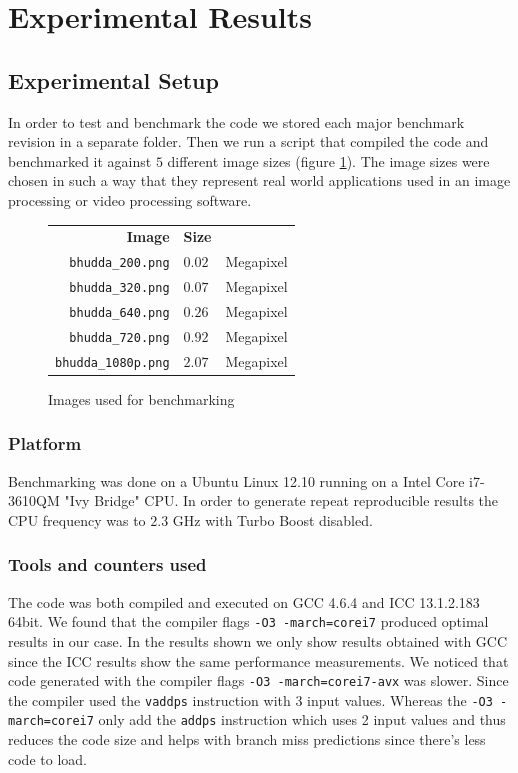 \section{Experimental Results}\label{sec:exp}
\subsection{Experimental Setup}\label{sec:exp_setup8}
In order to test and benchmark the code we stored each major benchmark revision in a separate folder. Then we run a script that compiled the code and benchmarked it against $5$ different image sizes (figure \ref{tab:images}). The image sizes were chosen in such a way that they represent real world applications used in an image processing or video processing software.
\begin{figure}
\centering
\begin{tabular}{rll}
\textbf{Image} & \textbf{Size}\\
\texttt{bhudda\_200.png} & $0.02$ & Megapixel\\
\texttt{bhudda\_320.png} & $0.07$ & Megapixel\\
\texttt{bhudda\_640.png} & $0.26$ & Megapixel\\
\texttt{bhudda\_720.png} & $0.92$ & Megapixel\\
\texttt{bhudda\_1080p.png} & $2.07$ & Megapixel\\
\end{tabular}
\caption{Images used for benchmarking}
\label{tab:images}
\end{figure}

\subsubsection{Platform}
Benchmarking was done on a Ubuntu Linux 12.10 running on a Intel Core i7-3610QM "Ivy Bridge" CPU. In order to generate repeat reproducible results the CPU frequency was to $2.3$ GHz with Turbo Boost disabled.
\subsubsection{Tools and counters used}
The code was both compiled and executed on GCC 4.6.4 and ICC 13.1.2.183 64bit. We found that the compiler flags \lstinline{-O3 -march=corei7} produced optimal results in our case. In the results shown we only show results obtained with GCC since the ICC results show the same performance measurements. We noticed that code generated with the compiler flags \lstinline{-O3 -march=corei7-avx} was slower. Since the compiler used the \lstinline{vaddps} instruction with 3 input values. Whereas the \lstinline{-O3 -march=corei7} only add the \lstinline{addps} instruction which uses 2 input values and thus reduces the code size and helps with branch miss predictions since there's less code to load. 
